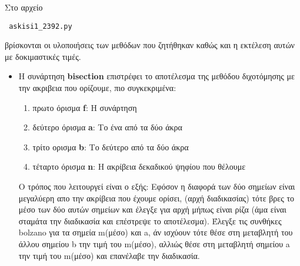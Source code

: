 \documentclass[a4paper,11pt]{article}
\newcommand{\lt}{\latintext}
\newcommand{\gt}{\greektext}
\begin{document}
	\begin{flushleft}
Στο αρχείο \lt 
\begin{verbatim} askisi1_2392.py
 \end{verbatim} 
 \gt βρίσκονται οι υλοποιήσεις των μεθόδων που ζητήθηκαν καθώς και η εκτέλεση αυτών με δοκιμαστικές τιμές.\linebreak \\

\begin{itemize}
\item Η συνάρτηση \lt \textbf{bisection} \gt επιστρέφει το αποτέλεσμα της μεθόδου διχοτόμησης με την ακριβεια που ορίζουμε, πιο συγκεκριμένα:\linebreak 
\begin{enumerate}
\item πρωτο όρισμα \lt \textbf{f}: \gt Η συνάρτηση
\item δεύτερο όρισμα \lt \textbf{a}: \gt Το ένα από τα δύο άκρα
\item τρίτο ορισμα \lt \textbf{b}: \gt Το δεύτερο από τα δύο άκρα
\item τέταρτο όρισμα \lt \textbf{n}: \gt Η ακρίβεια δεκαδικού ψηφίου που θέλουμε
\end{enumerate}\pagebreak 
Ο τρόπος που λειτουργεί είναι ο εξής:\linebreak 
	Εφόσον η διαφορά των δύο σημείων είναι μεγαλύερη απο την ακρίβεια που έχουμε ορίσει, (αρχή διαδικασίας) τότε βρες το μέσο των δύο αυτών σημείων και έλεγξε για αρχή μήπως είναι ρίζα (άμα είναι σταμάτα την διαδικασία και επέστρεψε το αποτέλεσμα). Έλεγξε τις συνθήκες \lt bolzano \gt για τα σημεία \lt m\gt (μέσο) και \lt a, \gt άν ισχύουν τότε θέσε στη μεταβλητή του άλλου σημείου \lt b \gt την τιμή του \lt m\gt (μέσο), αλλιώς θέσε στη μεταβλητή σημείου \lt a \gt την τιμή του \lt m\gt (μέσο) και επανέλαβε την διαδικασία.\linebreak \\
	

\end{itemize}
\end{flushleft}
\end{document}
